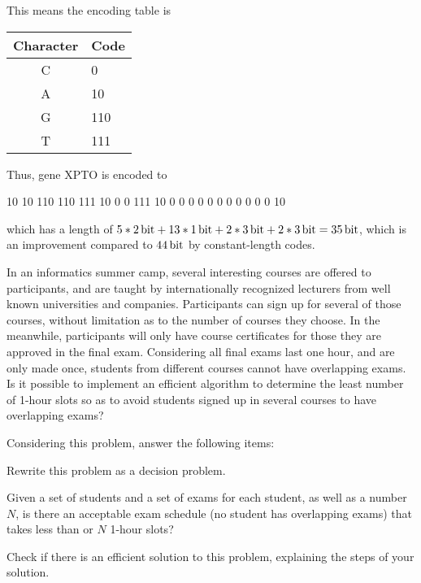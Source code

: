 {\newpage
This means the encoding table is

\begin{center} \begin{tabular}{c | l}
    \textbf{Character} & \textbf{Code} \\ \hline
    C & 0 \\
    A & 10 \\
    G & 110 \\
    T & 111 \\
\end{tabular} \end{center}

Thus, gene XPTO is encoded to

\begin{center}
    10 10 110 110 111 10 0 0 111 10 0 0 0 0 0 0 0 0 0 0 0 10
\end{center}

which has a length of $5*\SI{2}{\bit} + 13*\SI{1}{\bit} + 2*\SI{3}{\bit} + 2*\SI{3}{\bit} = \SI{35}{\bit}$, which is an improvement compared to $\SI{44}{\bit}$ by constant-length codes.

In an informatics summer camp, several interesting courses are offered to participants, and are taught by internationally recognized lecturers from well known universities and companies. Participants can sign up for several of those courses, without limitation as to the number of courses they choose. In the meanwhile, participants will only have course certificates for those they are approved in the final exam. Considering all final exams last one hour, and are only made once, students from different courses cannot have overlapping exams. Is it possible to implement an efficient algorithm to determine the least number of 1-hour slots so as to avoid students signed up in several courses to have overlapping exams?

Considering this problem, answer the following items:

Rewrite this problem as a decision problem.

\ansseparator

Given a set of students and a set of exams for each student, as well as a number $N$, is there an acceptable exam schedule (no student has overlapping exams) that takes less than or $N$ 1-hour slots?

Check if there is an efficient solution to this problem, explaining the steps of your solution.

}
